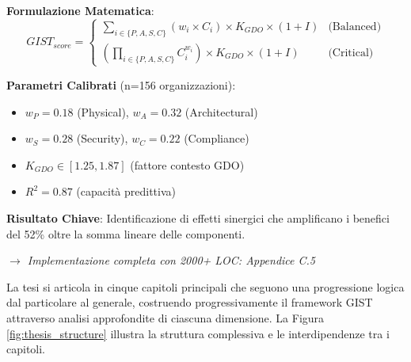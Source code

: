 \begin{bibunit}[IEEEtran]
\begin{tcolorbox}
\vspace{0.3cm}
\textbf{Formulazione Matematica}:
\begin{equation*}
GIST_{score} = \begin{cases}
\sum_{i \in \{P,A,S,C\}} (w_i \times C_i) \times K_{GDO} \times (1+I) & \text{(Balanced)} \\
\left(\prod_{i \in \{P,A,S,C\}} C_i^{w_i}\right) \times K_{GDO} \times (1+I) & \text{(Critical)}
\end{cases}
\end{equation*}

\vspace{0.3cm}
\textbf{Parametri Calibrati} (n=156 organizzazioni):
\begin{itemize}%
    \item $w_P = 0.18$ (Physical), $w_A = 0.32$ (Architectural)
    \item $w_S = 0.28$ (Security), $w_C = 0.22$ (Compliance)
    \item $K_{GDO} \in [1.25, 1.87]$ (fattore contesto GDO)
    \item $R^2 = 0.87$ (capacità predittiva)
\end{itemize}

\vspace{0.3cm}
\textbf{Risultato Chiave}: Identificazione di effetti sinergici che amplificano i benefici del 52\% oltre la somma lineare delle componenti.

\vspace{0.2cm}
\textit{$\rightarrow$ Implementazione completa con 2000+ LOC: Appendice C.5}
\end{tcolorbox}

La tesi si articola in cinque capitoli principali che seguono una progressione logica dal particolare al generale, costruendo progressivamente il framework GIST attraverso analisi approfondite di ciascuna dimensione. La Figura \ref{fig:thesis_structure} illustra la struttura complessiva e le interdipendenze tra i capitoli.


\end{bibunit}

